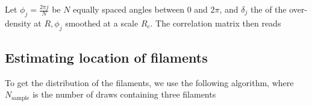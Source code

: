 \documentclass[useAMS,usenatbib,babel,superscriptaddress]{mnras}
\begin{document}
Let $\phi_j = \frac{2\pi j}{N}$ be $N$ equally spaced angles between $0$ and $2\pi$, and $\delta_j$ the of the over-density at $R, \phi_j$ smoothed at a scale $R_c$. The correlation matrix then reads


\subsection{Estimating location of filaments}

To get the distribution of the filaments, we use the following algorithm, where $N_\text{sample}$ is the number of draws containing three filaments
\end{document}
